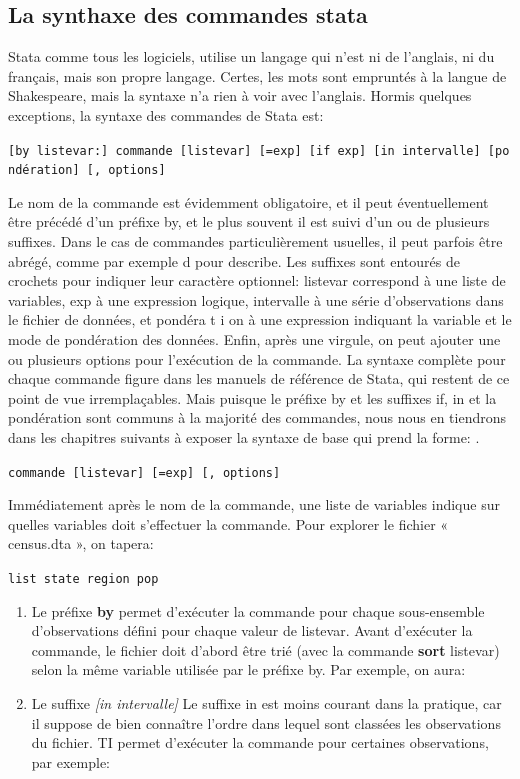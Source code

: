 \documentclass[
]{book}
\theoremstyle{definition}
\theoremstyle{definition}
\theoremstyle{definition}
\theoremstyle{definition}
\theoremstyle{remark}
\begin{document}
\hypertarget{la-synthaxe-des-commandes-stata}{%
\subsection{La synthaxe des commandes stata}\label{la-synthaxe-des-commandes-stata}}

Stata comme tous les logiciels, utilise un langage qui n'est ni de
l'anglais, ni du français, mais son propre langage. Certes, les
mots sont empruntés à la langue de Shakespeare, mais la syntaxe
n'a rien à voir avec l'anglais. Hormis quelques exceptions, la
syntaxe des commandes de Stata est:

\texttt{{[}by\ listevar:{]}\ commande\ {[}listevar{]}\ {[}=exp{]}\ {[}if\ exp{]}\ {[}in\ intervalle{]}\ {[}pondération{]}\ {[},\ options{]}}

Le nom de la commande est évidemment obligatoire, et il peut
éventuellement être précédé d'un préfixe by, et le plus souvent il
est suivi d'un ou de plusieurs suffixes. Dans le cas de
commandes particulièrement usuelles, il peut parfois être abrégé,
comme par exemple d pour describe. Les suffixes sont entourés de crochets pour indiquer leur caractère optionnel:
listevar correspond à une liste de variables, exp à une
expression logique, intervalle à une série d'observations
dans le fichier de données, et pondéra t i on à une expression
indiquant la variable et le mode de pondération des données.
Enfin, après une virgule, on peut ajouter une ou plusieurs
options pour l'exécution de la commande.
La syntaxe complète pour chaque commande figure dans les
manuels de référence de Stata, qui restent de ce point de vue
irremplaçables. Mais puisque le préfixe by et les suffixes if, in
et la pondération sont communs à la majorité des commandes,
nous nous en tiendrons dans les chapitres suivants à exposer la
syntaxe de base qui prend la forme: .

\texttt{commande\ {[}listevar{]}\ {[}=exp{]}\ {[},\ options{]}}

Immédiatement après le nom de la commande, une liste de
variables indique sur quelles variables doit s'effectuer la commande. Pour explorer le fichier « census.dta », on tapera:

\texttt{list\ state\ region\ pop}

\begin{enumerate}
\def\labelenumi{(\alph{enumi})}
\item
  Le préfixe \textbf{by}
  permet d'exécuter la commande pour chaque
  sous-ensemble d'observations défini pour chaque valeur de
  listevar. Avant d'exécuter la commande, le fichier doit
  d'abord être trié (avec la commande \textbf{sort} listevar) selon la
  même variable utilisée par le préfixe by. Par exemple, on aura:
\item
  Le suffixe \emph{{[}in intervalle{]}}
  Le suffixe in est moins courant dans la pratique, car il suppose
  de bien connaître l'ordre dans lequel sont classées les
  observations du fichier. TI permet d'exécuter la commande pour
  certaines observations, par exemple:
\end{enumerate}
\end{document}
